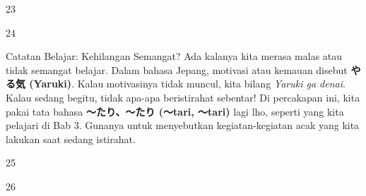\begin{convobox}{23}
    \noindent
      
      

    \vspace{1.5em}
\end{convobox}

\begin{convobox}{24}
    \noindent

    \vspace{1.5em}
\end{convobox}

\begin{lessonbox}{Catatan Belajar: Kehilangan Semangat?}
    Ada kalanya kita merasa malas atau tidak semangat belajar. Dalam bahasa Jepang, motivasi atau kemauan disebut \textbf{やる気 (Yaruki)}. Kalau motivasinya tidak muncul, kita bilang \textit{Yaruki ga denai}. \\
    
    Kalau sedang begitu, tidak apa-apa beristirahat sebentar! Di percakapan ini, kita pakai tata bahasa \textbf{〜たり、〜たり (〜tari, 〜tari)} lagi lho, seperti yang kita pelajari di Bab 3. Gunanya untuk menyebutkan kegiatan-kegiatan acak yang kita lakukan saat sedang istirahat.
\end{lessonbox}

\begin{convobox}{25}
    \noindent
      
      

    \vspace{1.5em}
\end{convobox}

\begin{convobox}{26}
    \noindent
      

    \vspace{1.5em}
\end{convobox}

